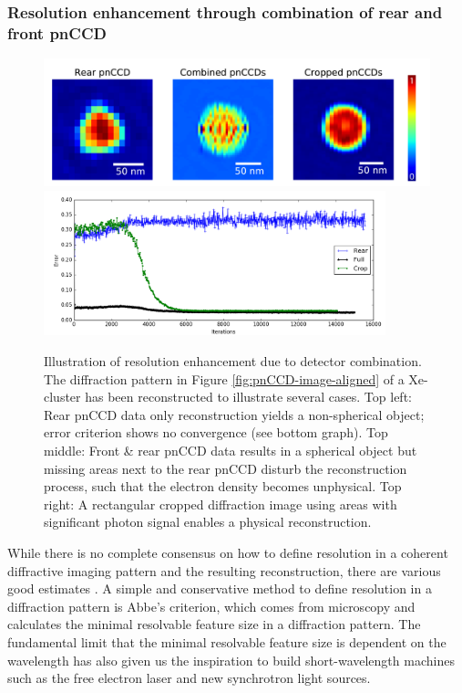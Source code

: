 \subsubsection{Resolution enhancement through combination of rear and front pnCCD}\label{sec:resolution-discussion}
\begin{figure}
  \begin{center}
   \includegraphics[width=1\linewidth]{images/Phase-retrieval-image.png}\\
   \includegraphics[height=4.2cm]{images/Phase-retrieval-error.png}
    \caption[Illustration of resolution enhancement and diffraction image cropping.]{Illustration of resolution enhancement due to detector combination. The diffraction pattern in Figure \ref{fig:pnCCD-image-aligned} of a Xe-cluster has been reconstructed to illustrate several cases. Top left: Rear pnCCD data only reconstruction yields a non-spherical object; error criterion shows no convergence (see bottom graph). Top middle: Front \& rear pnCCD data results in a spherical object but missing areas next to the rear pnCCD disturb the reconstruction process, such that the electron density becomes unphysical. Top right: A rectangular cropped diffraction image using areas with significant photon signal enables a physical reconstruction.}
\label{fig:phase-retrieval-image}
  \end{center}
\end{figure}
While there is no complete consensus on how to define resolution in a coherent diffractive imaging pattern and the resulting reconstruction, there are various good estimates \cite{Geilhufe-2014-OptcsExp,Ekeberg-2015-PRL,Chapman-2006-JOSA}. A simple and conservative method to define resolution in a diffraction pattern is Abbe's criterion, which comes from microscopy and calculates the minimal resolvable feature size in a diffraction pattern. The fundamental limit that the minimal resolvable feature size is dependent on the wavelength has also given us the inspiration to build short-wavelength machines such as the free electron laser and new synchrotron light sources.\\[1\baselineskip]
